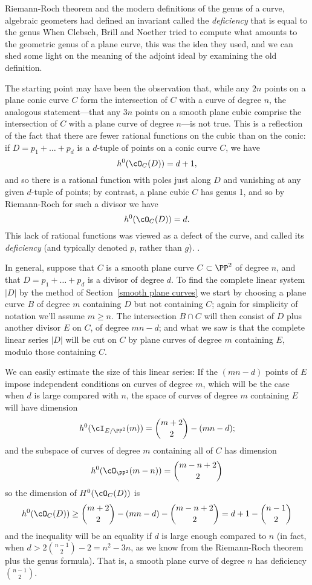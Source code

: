 Riemann-Roch theorem and the modern definitions of the genus of a curve, algebraic geometers had
defined an invariant called the \emph{deficiency} that is equal to the genus When Clebsch, Brill and Noether tried to 
compute what amounts to the geometric genus of a plane curve, this was the idea they used, and we can shed some light
on the meaning of the adjoint ideal by examining the old definition.

The starting point may have been the observation that, while any $2n$ points on a plane conic curve $C$ form the intersection of $C$ with a  curve of degree $n$, the analogous statement---that any $3n$ points on a smooth plane cubic comprise the intersection of $C$ with a plane curve of degree $n$---is not true. This is a reflection of the fact that there are fewer rational functions on the cubic than on the conic: if $D = p_1+\dots + p_d$ is a $d$-tuple of points on a conic curve $C$, we have
$$
h^0(\cO_C(D)) = d+1,
$$ 
and so there is a rational function with poles just along $D$ and vanishing at any given $d$-tuple of points; by contrast, a plane cubic $C$ has genus 1, and so by Riemann-Roch for such a divisor we have
$$
h^0(\cO_C(D)) = d.
$$
This lack of rational functions was viewed as a defect of the curve, and called its \emph{deficiency} (and typically denoted $p$, rather than $g$). .

In general, suppose that $C$ is a smooth plane curve $C \subset \PP^2$ of degree $n$, and that $D = p_1+\dots + p_d$ is a divisor of degree $d$. To find the complete linear system $|D|$ by the method of Section~\ref{smooth plane curves} we start by choosing a plane curve $B$ of degree $m$ containing $D$ but not containing $C$; again for simplicity of notation we'll assume $m \geq n$. The intersection $B \cap C$ will then consist of $D$ plus another divisor $E$ on $C$, of degree $mn-d$; and what we saw is that the complete linear series $|D|$ will be cut on $C$ by plane curves of degree $m$ containing $E$, modulo those containing $C$.

We can easily estimate the size of this linear series: If the $(mn-d)$ points of $E$ impose independent conditions on curves of degree $m$, which will be the case when $d$ is large compared with $n$, the space of curves of degree $m$ containing $E$ will have dimension
$$
h^0(\cI_{E/\PP^2}(m)) = \binom{m+2}{2} - (mn-d);
$$ 
and the subspace of curves of degree $m$ containing all of $C$ has dimension
$$
h^0(\cO_{\PP^2}(m-n)) = \binom{m-n+2}{2}
$$
so the dimension of $H^0(\cO_C(D))$ is
$$
h^0(\cO_C(D)) \geq \binom{m+2}{2} - (mn-d) -  \binom{m-n+2}{2} = d + 1 - \binom{n-1}{2}
$$
and the inequality will be an equality if $d$ is large enough compared to $n$ (in fact,  when $d> 2\binom{n-1}{2}-2 = n^2-3n$,
as we know from the Riemann-Roch theorem plus the genus formula).  That is, a smooth plane curve of degree $n$ has deficiency $\binom{n-1}{2}$.

